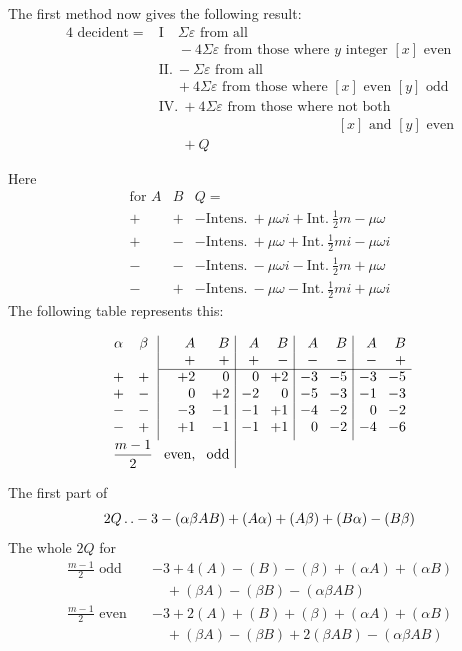 The first method now gives the following result:
\[
\begin{aligned}
4\text{ decident}={}&\mathrm{I}\quad\Sigma\varepsilon\text{ from all}\\
&\phantom{\mathrm{I}\quad}{-}4\Sigma\varepsilon\text{ from those where }y\text{ integer }[x]\text{ even}\\[3pt]
&\mathrm{II.}\ {-}\Sigma\varepsilon\text{ from all}\\
&\phantom{\mathrm{II.}\ }{+}4\Sigma\varepsilon\text{ from those where }[x]\text{ even }[y]\text{ odd}\\[3pt]
&\mathrm{IV.}\ {+}4\Sigma\varepsilon\text{ from those where not both}\\
&\phantom{\mathrm{IV.}\ {+}4\Sigma\varepsilon\text{ from those where }}[x]\text{ and }[y]\text{ even}\\
&\phantom{\mathrm{IV.}\ }{+}Q
\end{aligned}
\]

Here
\[
\begin{array}{cc|l}
\text{for }A&B&Q=\\
+&+&-\text{Intens.}\ {+}\mu\omega i+\text{Int.}\ \frac12m-\mu\omega\\
+&-&-\text{Intens.}\ {+}\mu\omega+\text{Int.}\ \frac12mi-\mu\omega i\\
-&-&-\text{Intens.}\ {-}\mu\omega i-\text{Int.}\ \frac12m+\mu\omega\\
-&+&-\text{Intens.}\ {-}\mu\omega-\text{Int.}\ \frac12mi+\mu\omega i
\end{array}
\]
The following table represents this:

\[
\setlength{\arraycolsep}{4pt}
\begin{array}{cc|rr|rr|rr|rr}
\alpha&\beta& A&B&A&B&A&B&A&B\\
&&+&+&+&-&-&-&-&+\\ \cline{3-10}
+&+&+2&0&0&+2&-3&-5&-3&-5\\
+&-&0&+2&-2&0&-5&-3&-1&-3\\
-&-&-3&-1&-1&+1&-4&-2&0&-2\\
-&+&+1&-1&-1&+1&0&-2&-4&-6\\[3pt]
\multicolumn{2}{r}{\dfrac{m-1}{2}}&\text{even,}&\text{odd}&\multicolumn{6}{c}{}
\end{array}
\]

The first part of
\[
2Q\mathinner{.\,.} -3-(\alpha\beta AB)+(A\alpha)+(A\beta)+(B\alpha)-(B\beta)
\]
The whole $2Q$ for
\[
\begin{aligned}
\frac{m-1}{2}\text{ odd}\quad&-3+4(A)-(B)-(\beta)+(\alpha A)+(\alpha B)\\
&\quad +(\beta A)-(\beta B)-(\alpha\beta AB)\\[3pt]
\frac{m-1}{2}\text{ even}\quad&-3+2(A)+(B)+(\beta)+(\alpha A)+(\alpha B)\\
&\quad +(\beta A)-(\beta B)+2(\beta AB)-(\alpha\beta AB)
\end{aligned}
\]

